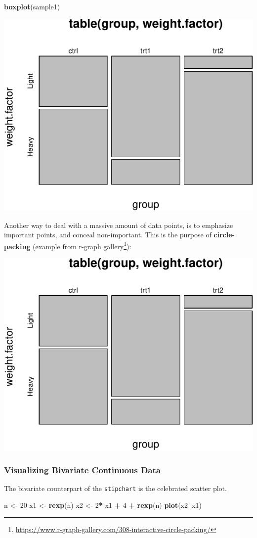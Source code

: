 \documentclass[]{book}
\newenvironment{Shaded}{\begin{snugshade}}{\end{snugshade}}
\newcommand{\DecValTok}[1]{\textcolor[rgb]{0.00,0.00,0.81}{#1}}
\newcommand{\KeywordTok}[1]{\textcolor[rgb]{0.13,0.29,0.53}{\textbf{#1}}}
\newcommand{\NormalTok}[1]{#1}
\newcommand{\OperatorTok}[1]{\textcolor[rgb]{0.81,0.36,0.00}{\textbf{#1}}}
\newcommand{\StringTok}[1]{\textcolor[rgb]{0.31,0.60,0.02}{#1}}
\renewcommand{\href}[2]{#2\footnote{\url{#1}}}
\theoremstyle{definition}
\theoremstyle{definition}
\theoremstyle{definition}
\theoremstyle{remark}
\begin{document}
\begin{Shaded}
\begin{Highlighting}[]
\KeywordTok{boxplot}\NormalTok{(sample1)    }
\end{Highlighting}
\end{Shaded}

\includegraphics[width=0.5\linewidth]{Rcourse_files/figure-latex/unnamed-chunk-136-1}

Another way to deal with a massive amount of data points, is to emphasize important points, and conceal non-important.
This is the purpose of \textbf{circle-packing} (example from \href{https://www.r-graph-gallery.com/308-interactive-circle-packing/}{r-graph gallery}):

\includegraphics[width=0.5\linewidth]{Rcourse_files/figure-latex/unnamed-chunk-137-1}

\hypertarget{visualizing-bivariate-continuous-data}{%
\subsubsection{Visualizing Bivariate Continuous Data}\label{visualizing-bivariate-continuous-data}}

The bivariate counterpart of the \texttt{stipchart} is the celebrated scatter plot.

\begin{Shaded}
\begin{Highlighting}[]
\NormalTok{n <-}\StringTok{ }\DecValTok{20}
\NormalTok{x1 <-}\StringTok{ }\KeywordTok{rexp}\NormalTok{(n)}
\NormalTok{x2 <-}\StringTok{ }\DecValTok{2}\OperatorTok{*}\StringTok{ }\NormalTok{x1 }\OperatorTok{+}\StringTok{ }\DecValTok{4} \OperatorTok{+}\StringTok{ }\KeywordTok{rexp}\NormalTok{(n)}
\KeywordTok{plot}\NormalTok{(x2}\OperatorTok{~}\NormalTok{x1)}
\end{Highlighting}
\end{Shaded}
\end{document}
